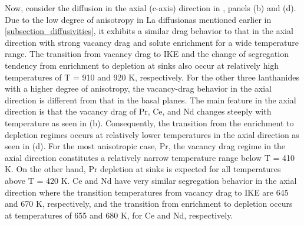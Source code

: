 \documentclass[preprint,12pt]{elsarticle}
\providecommand{\DIFadd}[1]{{\bf #1}} %
\providecommand{\DIFdel}[1]{} %
\providecommand{\DIFaddbegin}{\protect\color{blue}} %
\providecommand{\DIFaddend}{\protect\color{black}} %
\providecommand{\DIFdelbegin}{\protect\color{red}} %
\newcommand{\DIFscaledelfig}{0.5}
\newlength{\DIFdelgraphicswidth} %
\newlength{\DIFdelgraphicsheight} %
\newcommand{\DIFaddincludegraphics}[2][]{{\color{blue}\fbox{\DIFOincludegraphics[#1]{#2}}}} %
\newcommand{\DIFdelincludegraphics}[2][]{%
\sbox{\DIFdelgraphicsbox}{\DIFOincludegraphics[#1]{#2}}%
\settoboxwidth{\DIFdelgraphicswidth}{\DIFdelgraphicsbox} %
\settoboxtotalheight{\DIFdelgraphicsheight}{\DIFdelgraphicsbox} %
\scalebox{\DIFscaledelfig}{%
\parbox[b]{\DIFdelgraphicswidth}{\usebox{\DIFdelgraphicsbox}\\[-\baselineskip] \rule{\DIFdelgraphicswidth}{0em}}\llap{\resizebox{\DIFdelgraphicswidth}{\DIFdelgraphicsheight}{%
\setlength{\unitlength}{\DIFdelgraphicswidth}%
\begin{picture}(1,1)%
\thicklines\linethickness{2pt} %
{\color[rgb]{1,0,0}\put(0,0){\framebox(1,1){}}}%
{\color[rgb]{1,0,0}\put(0,0){\line( 1,1){1}}}%
{\color[rgb]{1,0,0}\put(0,1){\line(1,-1){1}}}%
\end{picture}%
}\hspace*{3pt}}} %
} %
\DeclareRobustCommand{\DIFaddbegin}{\DIFOaddbegin \let\includegraphics\DIFaddincludegraphics} %
\DeclareRobustCommand{\DIFaddend}{\DIFOaddend \let\includegraphics\DIFOincludegraphics} %
\DeclareRobustCommand{\DIFdelbegin}{\DIFOdelbegin \let\includegraphics\DIFdelincludegraphics} %
\begin{document}
Now, consider the diffusion in the axial (c-axis) direction in , panels (b) and (d). Due to the low degree of anisotropy in La diffusion\DIFaddbegin \DIFadd{, }\DIFaddend as mentioned earlier in \cref{subsection_diffusivities}, it exhibits a similar drag behavior to that in the axial direction with strong vacancy drag and solute enrichment for a wide temperature range. The transition from vacancy drag to IKE and the change of segregation tendency from enrichment to depletion at sinks also occur at relatively high temperatures of T = 910 and 920 K, respectively. For the other three lanthanides with a higher degree of anisotropy, the vacancy-drag behavior in the axial direction is different from that in the basal planes. The main feature in the axial direction is that the vacancy drag of Pr, Ce, and Nd changes steeply with temperature as seen in (b). Consequently, the transition from the enrichment to depletion regimes occurs at relatively lower temperatures in the axial direction as seen in (d). For the most anisotropic case, Pr, the vacancy drag regime in the axial direction constitutes a relatively narrow temperature range below T = 410 K. On the other hand, Pr depletion at sinks is expected for all temperatures above T = 420 K. Ce and Nd have very similar segregation behavior in the axial direction where the transition temperatures from vacancy drag to IKE are 645 and 670 K, respectively, and the transition from enrichment to depletion occurs at temperatures of 655 and 680 K, for Ce and Nd, respectively.



\DIFdelbegin \DIFdel{Finally, to get an insight into the sink enrichment/depletion tendencies in a polycrystalline microstructure, we obtain an average of the transport coefficients along three crystallographic directions:
}\begin{displaymath}
   \DIFdel{L_{VB}^{av} = \frac{1}{3} ( L_{VB}^{[1 0 \overline{1} 0] } +  L_{VB}^{[0 1 \overline{1} 0]} +   L_{VB}^{[0 0 0 1]}) = \frac{2}{3}  L_{VB}^{basal} + \frac{1}{3}  L_{VB}^{axial}
   \label{av_LVB}
}\end{displaymath}%
\DIFdel{and, similarly :
}\begin{displaymath}
    \DIFdel{L_{AV}^{av} = \frac{2}{3}  L_{AV}^{basal} + \frac{1}{3}  L_{AV}^{axial}
    \label{av_LAV}
}\end{displaymath}%
\DIFdel{The $D_{pd}$ for the polycrystalline Zr from these two average transport coefficients was calculated for the four lanthanides and is plotted in \Cref{fig:pdc_average}. The resulting $D_{pd}$ versus temperature behavior is a left shift of the basal plane results. For Nd, La, and Ce, the transition temperatures from vacancy drag to the IKE regime are slightly lower than when only considering diffusion in the basal planes. For Pr, the axial contribution makes the transition to the depletion regime feasible at high temperatures above 1075 K, unlike the case of basal diffusion. It should be noted that in this treatment we neglect the contribution from diffusion along grain boundaries and we are assuming a random grain orientation without texture.
}%
\end{document}
